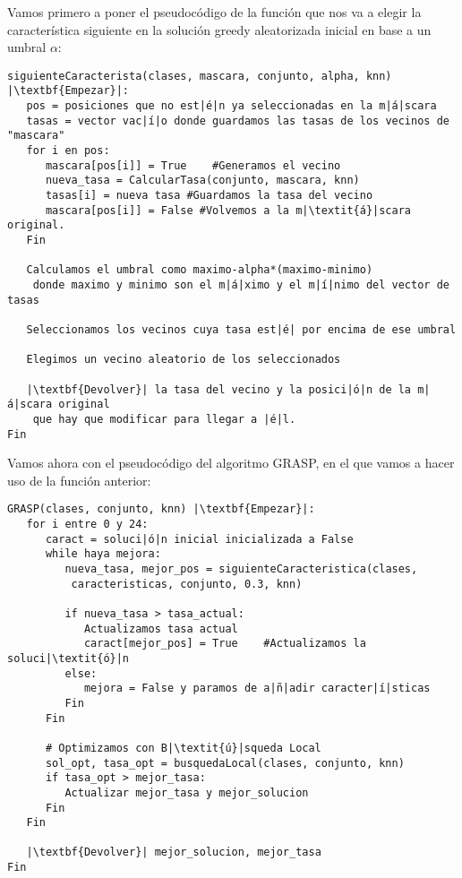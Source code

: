 \documentclass[12pt]{article}
\begin{document}
Vamos primero a poner el pseudocódigo de la función que nos va a elegir la característica siguiente en la solución greedy aleatorizada inicial en base a un umbral $\alpha$:
\begin{lstlisting}
siguienteCaracterista(clases, mascara, conjunto, alpha, knn) |\textbf{Empezar}|:
   pos = posiciones que no est|é|n ya seleccionadas en la m|á|scara
   tasas = vector vac|í|o donde guardamos las tasas de los vecinos de "mascara"
   for i en pos:
      mascara[pos[i]] = True	#Generamos el vecino
      nueva_tasa = CalcularTasa(conjunto, mascara, knn)
      tasas[i] = nueva tasa #Guardamos la tasa del vecino
      mascara[pos[i]] = False #Volvemos a la m|\textit{á}|scara original.
   Fin
   
   Calculamos el umbral como maximo-alpha*(maximo-minimo)
    donde maximo y minimo son el m|á|ximo y el m|í|nimo del vector de tasas
   
   Seleccionamos los vecinos cuya tasa est|é| por encima de ese umbral
   
   Elegimos un vecino aleatorio de los seleccionados
   
   |\textbf{Devolver}| la tasa del vecino y la posici|ó|n de la m|á|scara original
    que hay que modificar para llegar a |é|l.
Fin
\end{lstlisting}

Vamos ahora con el pseudocódigo del algoritmo GRASP, en el que vamos a hacer uso de la función anterior:
\begin{lstlisting}
GRASP(clases, conjunto, knn) |\textbf{Empezar}|:
   for i entre 0 y 24:
      caract = soluci|ó|n inicial inicializada a False
      while haya mejora:
         nueva_tasa, mejor_pos = siguienteCaracteristica(clases,
          caracteristicas, conjunto, 0.3, knn)
      
         if nueva_tasa > tasa_actual:
            Actualizamos tasa actual
            caract[mejor_pos] = True 	#Actualizamos la soluci|\textit{ó}|n
         else:
            mejora = False y paramos de a|ñ|adir caracter|í|sticas
         Fin
      Fin
   
      # Optimizamos con B|\textit{ú}|squeda Local
      sol_opt, tasa_opt = busquedaLocal(clases, conjunto, knn)
      if tasa_opt > mejor_tasa:
         Actualizar mejor_tasa y mejor_solucion
      Fin
   Fin
   
   |\textbf{Devolver}| mejor_solucion, mejor_tasa
Fin

\end{lstlisting}
\end{document}
